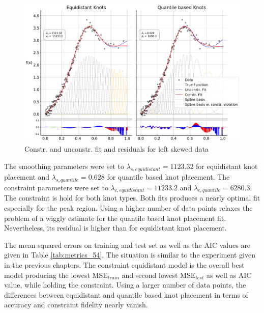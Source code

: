 \documentclass[10pt,a4paper]{article}
\begin{document}
\begin{figure}[H]
	\centering
	\includegraphics[width=\columnwidth]{../thesisplots/exp_beta/exp_left_skewed_data_ndata_2500_rseed_1.pdf}
	\caption{Constr. and unconstr. fit and residuals for left skewed data}
	\label{fig:fit_left_skew_2500}
\end{figure}

The smoothing parameters were set to $\lambda_{s, equidistant} = 1123.32$ for equidistant knot placement and $\lambda_{s, quantile} = 0.628$ for quantile based knot placement. The constraint parameters were set to $\lambda_{c, equidistant} = 11233.2$ and $\lambda_{c, quantile} = 6280.3$. The constraint is hold for both knot types. Both fits produces a nearly optimal fit especially for the peak region. Using a higher number of data points relaxes the problem of a wiggly estimate for the quantile based knot placement fit. Nevertheless, its residual is higher than for equidistant knot placement.

The mean squared errors on training and test set as well as the AIC values are given in Table \ref{tab:metrics_54}. The situation is similar to the experiment given in the previous chapters. The constraint equidistant model is the overall best model producing the lowest $\text{MSE}_{train}$ and second lowest $\text{MSE}_{test}$ as well as AIC value, while holding the constraint. Using a larger number of data points, the differences between equidistant and quantile based knot placement in terms of accuracy and constraint fidelity nearly vanish. 
\end{document}
